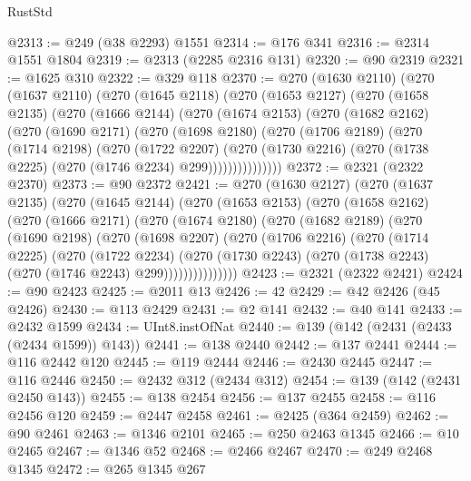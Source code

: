 \begin{lexlean}{RustStd}
\begin{coremodule}
@2313 := @249 (@38 @2293) @1551
@2314 := @176 @341
@2316 := @2314 @1551 @1804
@2319 := @2313 (@2285 @2316 @131)
@2320 := @90 @2319
@2321 := @1625 @310
@2322 := @329 @118
@2370 := @270
    (@1630 @2110)
    (@270
      (@1637 @2110)
      (@270
        (@1645 @2118)
        (@270
          (@1653 @2127)
          (@270
            (@1658 @2135)
            (@270
              (@1666 @2144)
              (@270
                (@1674 @2153)
                (@270
                  (@1682 @2162)
                  (@270
                    (@1690 @2171)
                    (@270
                      (@1698 @2180)
                      (@270
                        (@1706 @2189)
                        (@270
                          (@1714 @2198)
                          (@270
                            (@1722 @2207)
                            (@270
                              (@1730 @2216)
                              (@270 (@1738 @2225) (@270 (@1746 @2234) @299)))))))))))))))
@2372 := @2321 (@2322 @2370)
@2373 := @90 @2372
@2421 := @270
    (@1630 @2127)
    (@270
      (@1637 @2135)
      (@270
        (@1645 @2144)
        (@270
          (@1653 @2153)
          (@270
            (@1658 @2162)
            (@270
              (@1666 @2171)
              (@270
                (@1674 @2180)
                (@270
                  (@1682 @2189)
                  (@270
                    (@1690 @2198)
                    (@270
                      (@1698 @2207)
                      (@270
                        (@1706 @2216)
                        (@270
                          (@1714 @2225)
                          (@270
                            (@1722 @2234)
                            (@270
                              (@1730 @2243)
                              (@270 (@1738 @2243) (@270 (@1746 @2243) @299)))))))))))))))
@2423 := @2321 (@2322 @2421)
@2424 := @90 @2423
@2425 := @2011 @13
@2426 := 42
@2429 := @42 @2426 (@45 @2426)
@2430 := @113 @2429
@2431 := @2 @141
@2432 := @40 @141
@2433 := @2432 @1599
@2434 := UInt8.instOfNat
@2440 := @139 (@142 (@2431 (@2433 (@2434 @1599)) @143))
@2441 := @138 @2440
@2442 := @137 @2441
@2444 := @116 @2442 @120
@2445 := @119 @2444
@2446 := @2430 @2445
@2447 := @116 @2446
@2450 := @2432 @312 (@2434 @312)
@2454 := @139 (@142 (@2431 @2450 @143))
@2455 := @138 @2454
@2456 := @137 @2455
@2458 := @116 @2456 @120
@2459 := @2447 @2458
@2461 := @2425 (@364 @2459)
@2462 := @90 @2461
@2463 := @1346 @2101
@2465 := @250 @2463 @1345
@2466 := @10 @2465
@2467 := @1346 @52
@2468 := @2466 @2467
@2470 := @249 @2468 @1345
@2472 := @265 @1345 @267

\end{coremodule}
\end{lexlean}

